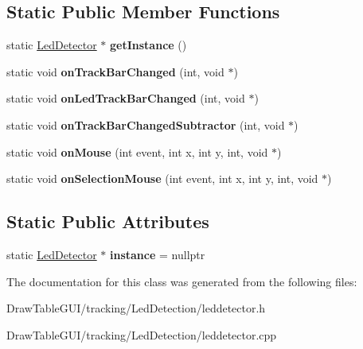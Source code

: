 \subsection*{Static Public Member Functions}
\begin{DoxyCompactItemize}
\item 
\hypertarget{classLedDetector_aca9f616100e09aabf7c9a07535f72bf5}{}static \hyperlink{classLedDetector}{Led\+Detector} $\ast$ {\bfseries get\+Instance} ()\label{classLedDetector_aca9f616100e09aabf7c9a07535f72bf5}

\item 
\hypertarget{classLedDetector_a14c32ea7c63fdc6d40bcb7c259724e0d}{}static void {\bfseries on\+Track\+Bar\+Changed} (int, void $\ast$)\label{classLedDetector_a14c32ea7c63fdc6d40bcb7c259724e0d}

\item 
\hypertarget{classLedDetector_acf48918b29de16bcbec9762fac60c3f1}{}static void {\bfseries on\+Led\+Track\+Bar\+Changed} (int, void $\ast$)\label{classLedDetector_acf48918b29de16bcbec9762fac60c3f1}

\item 
\hypertarget{classLedDetector_a26e9d8438a60e842d8c9cb9cdbfd2bd5}{}static void {\bfseries on\+Track\+Bar\+Changed\+Subtractor} (int, void $\ast$)\label{classLedDetector_a26e9d8438a60e842d8c9cb9cdbfd2bd5}

\item 
\hypertarget{classLedDetector_acee2318d7dbd0573f204770f4af6b581}{}static void {\bfseries on\+Mouse} (int event, int x, int y, int, void $\ast$)\label{classLedDetector_acee2318d7dbd0573f204770f4af6b581}

\item 
\hypertarget{classLedDetector_a4a413aed69397aca0ae1e6a24082b869}{}static void {\bfseries on\+Selection\+Mouse} (int event, int x, int y, int, void $\ast$)\label{classLedDetector_a4a413aed69397aca0ae1e6a24082b869}

\end{DoxyCompactItemize}
\subsection*{Static Public Attributes}
\begin{DoxyCompactItemize}
\item 
\hypertarget{classLedDetector_addb453acafab885280ad486bf9063baf}{}static \hyperlink{classLedDetector}{Led\+Detector} $\ast$ {\bfseries instance} = nullptr\label{classLedDetector_addb453acafab885280ad486bf9063baf}

\end{DoxyCompactItemize}


The documentation for this class was generated from the following files\+:\begin{DoxyCompactItemize}
\item 
Draw\+Table\+G\+U\+I/tracking/\+Led\+Detection/leddetector.\+h\item 
Draw\+Table\+G\+U\+I/tracking/\+Led\+Detection/leddetector.\+cpp\end{DoxyCompactItemize}
